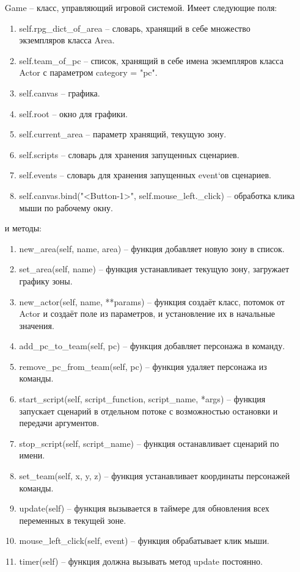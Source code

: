 \begin{enumerate}
\begin{enumerate}
	\end{enumerate}
	\item[Game] -- класс, управляющий игровой системой. Имеет следующие поля:
	\begin{enumerate}
		\item self.rpg\_dict\_of\_area -- словарь, хранящий в себе множество экземпляров класса Area.
		\item self.team\_of\_pc -- список, хранящий в себе имена экземпляров класса Actor с параметром category = "pc".
		\item self.canvas -- графика.
		\item self.root -- окно для графики.
		\item self.current\_area -- параметр хранящий, текущую зону.
		\item self.scripts -- словарь для хранения запущенных сценариев.
		\item self.events -- словарь для хранения запущенных event`ов сценариев.
		\item self.canvas.bind("<Button-1>", self.mouse\_left.\_click) -- обработка клика мыши по рабочему окну.
	\end{enumerate}
	и методы:
	\begin{enumerate}
		\item new\_area(self, name, area) -- функция добавляет новую зону в список.
		\item set\_area(self, name) -- функция устанавливает текущую зону, загружает графику зоны.
		\item new\_actor(self, name, **params) -- функция создаёт класс, потомок от Actor и создаёт поле из параметров, и установление их в начальные значения.
		\item add\_pc\_to\_team(self, pc) -- функция добавляет персонажа в команду.
		\item remove\_pc\_from\_team(self, pc) -- функция удаляет персонажа из команды.
		\item start\_script(self, script\_function, script\_name, *args) -- функция запускает сценарий в отдельном потоке с возможностью остановки и передачи аргументов.
		\item stop\_script(self, script\_name) -- функция останавливает сценарий по имени.
		\item set\_team(self, x, y, z) -- функция устанавливает координаты персонажей команды.
		\item update(self) -- функция вызывается в таймере для обновления всех переменных в текущей зоне.
		\item mouse\_left\_click(self, event) -- функция обрабатывает клик мыши.
		\item timer(self) -- функция должна вызывать метод update постоянно.
	\end{enumerate}
\end{enumerate}

